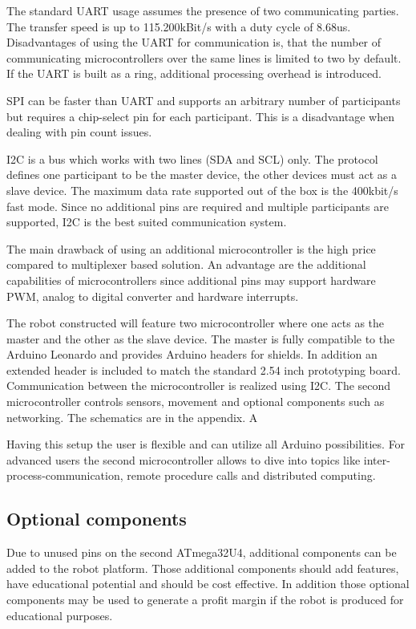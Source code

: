 \documentclass[11pt,a4paper]{article}
\begin{document}
The standard UART usage assumes the presence of two communicating parties. The transfer speed is up to 115.200kBit/s with a duty cycle of 8.68us. Disadvantages of using the UART for communication is, that the number of communicating microcontrollers over the same lines is limited to two by default. If the UART is built as a ring, additional processing overhead is introduced. 

SPI can be faster than UART and supports an arbitrary number of participants but requires a chip-select pin for each participant. This is a disadvantage when dealing with pin count issues.

I2C is a bus which works with two lines (SDA and SCL) only. The protocol defines one participant to be the master device, the other devices must act as a slave device. The maximum data rate supported out of the box is the 400kbit/s fast mode. Since no additional pins are required and multiple participants are supported, I2C is the best suited communication system.

The main drawback of using an additional microcontroller is the high price compared to multiplexer based solution. An advantage are the additional capabilities of microcontrollers since additional pins may support hardware PWM, analog to digital converter and hardware interrupts.  

The robot constructed will feature two microcontroller where one acts as the master and the other as the slave device. The master is fully compatible to the Arduino Leonardo and provides Arduino headers for shields. In addition an extended header is included to match the standard 2.54 inch prototyping board. Communication between the microcontroller is realized using I2C. The second microcontroller controls sensors, movement and optional components such as networking. The schematics are in the appendix. A 

Having this setup the user is flexible and can utilize all Arduino possibilities. For advanced users the second microcontroller allows to dive into topics like inter-process-communication, remote procedure calls and distributed computing.  

\subsection{Optional components}
Due to unused pins on the second ATmega32U4, additional components can be added to the robot platform. Those additional components should add features, have educational potential and should be cost effective. In addition those optional components may be used to generate a profit margin if the robot is produced for educational purposes.
\end{document}
